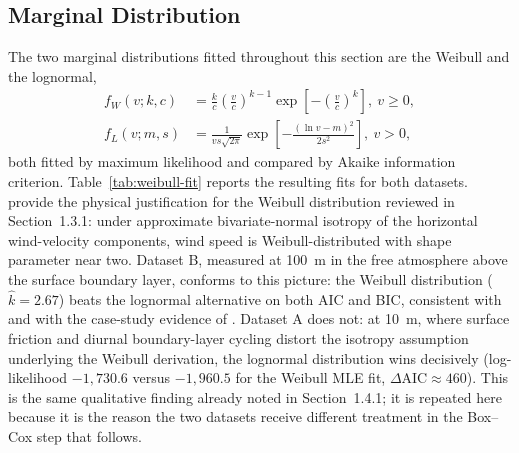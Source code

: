 \subsection{Marginal Distribution}
\label{sec:phase1-marginal}

The two marginal distributions fitted throughout this section are the Weibull and the lognormal,
\begin{align}
f_W(v;k,c) &= \frac{k}{c}\left(\frac{v}{c}\right)^{k-1}\exp\left[-\left(\frac{v}{c}\right)^k\right],\ v \geq 0, \\
f_L(v;m,s) &= \frac{1}{vs\sqrt{2\pi}}\exp\left[-\frac{(\ln v - m)^2}{2s^2}\right],\ v > 0,
\end{align}
both fitted by maximum likelihood and compared by Akaike information criterion. Table~\ref{tab:weibull-fit} reports the resulting fits for both datasets. \citet{TullerBrett1984} provide the physical justification for the Weibull distribution reviewed in Section~1.3.1: under approximate bivariate-normal isotropy of the horizontal wind-velocity components, wind speed is Weibull-distributed with shape parameter near two. Dataset B, measured at 100~m in the free atmosphere above the surface boundary layer, conforms to this picture: the Weibull distribution ($\hat k = 2.67$) beats the lognormal alternative on both AIC and BIC, consistent with \citet{TullerBrett1984} and with the case-study evidence of \citet{Garcia1998}. Dataset A does not: at 10~m, where surface friction and diurnal boundary-layer cycling distort the isotropy assumption underlying the Weibull derivation, the lognormal distribution wins decisively (log-likelihood $-1{,}730.6$ versus $-1{,}960.5$ for the Weibull MLE fit, $\Delta\text{AIC} \approx 460$). This is the same qualitative finding already noted in Section~1.4.1; it is repeated here because it is the reason the two datasets receive different treatment in the Box--Cox step that follows.

